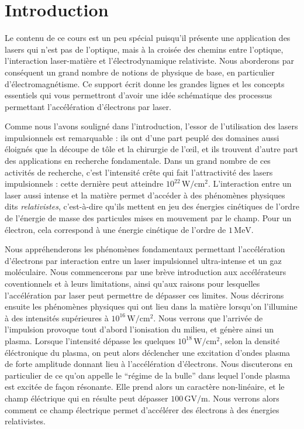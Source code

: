 \documentclass[a4paper]{book}
\begin{document}
\section{Introduction}
Le contenu de ce cours est un peu spécial puisqu'il présente une application des lasers qui n'est pas de l'optique, mais à la croisée des chemins entre l'optique, l'interaction laser-matière et l'électrodynamique relativiste. Nous aborderons par conséquent un grand nombre de notions de physique de base, en particulier d'électromagnétisme. Ce support écrit donne les grandes lignes et les concepts essentiels qui vous permettront d'avoir une idée schématique des processus permettant l'accélération d'électrons par laser. 

Comme nous l'avons souligné dans l'introduction, l'essor de l'utilisation des lasers impulsionnels est remarquable : ils ont d'une part peuplé des domaines aussi éloignés que la découpe de tôle et la chirurgie de l'\oe{}il, et ils trouvent d'autre part des applications en recherche fondamentale. Dans un grand nombre de ces activités de recherche, c'est l'intensité crête qui fait l'attractivité des lasers impulsionnels : cette dernière peut atteindre $10^{22}\,\mathrm{W/cm^2}$. L'interaction entre un laser aussi intense et la matière permet d'accéder à des phénomènes physiques dits \textit{relativistes}, c'est-à-dire qu'ils mettent en jeu des énergies cinétiques de l'ordre de l'énergie de masse des particules mises en mouvement par le champ. Pour un électron, cela correspond à une énergie cinétique de l'ordre de $1\,\mathrm{MeV}$. 


Nous appréhenderons les phénomènes fondamentaux permettant l'accélération d'électrons par interaction entre un laser impulsionnel ultra-intense et un gaz moléculaire. Nous commencerons par une brève introduction aux accélérateurs coventionnels et à leurs limitations, ainsi qu'aux raisons pour lesquelles l'accélération par laser peut permettre de dépasser ces limites. Nous décrirons ensuite les phénomènes physiques qui ont lieu dans la matière lorsqu'on l'illumine à des intensités supérieures à $10^{16}\,\mathrm{W/cm^2}$. Nous verrons que l'arrivée de l'impulsion provoque tout d'abord l'ionisation du milieu, et génère ainsi un plasma. Lorsque l'intensité dépasse les quelques $10^{18}\,\mathrm{W/cm^2}$, selon la densité éléctronique du plasma, on peut alors déclencher une excitation d'ondes plasma de forte amplitude donnant lieu à l'accélération d'électrons. Nous discuterons en particulier de ce qu'on appelle le ``régime de la bulle'' dans lequel l'onde plasma est excitée de façon résonante. Elle prend alors un caractère non-linéaire, et le champ éléctrique qui en résulte peut dépasser $100\,\textrm{GV/m}$. Nous verrons alors comment ce champ électrique permet d'accélérer des électrons à des énergies relativistes.
\end{document}
